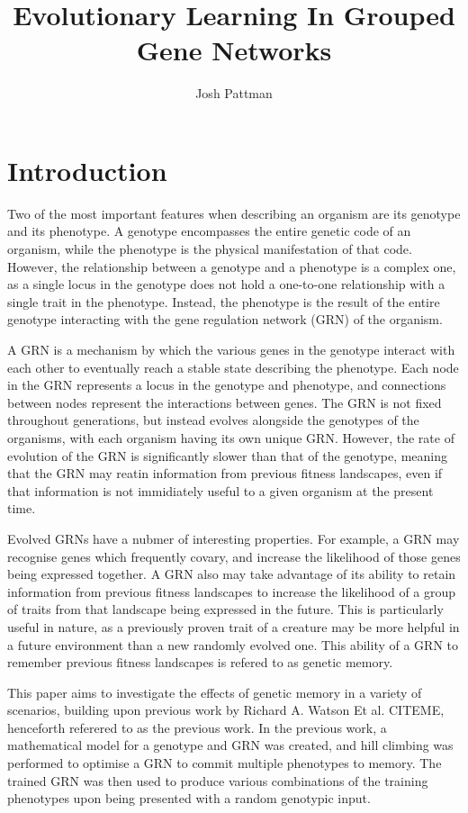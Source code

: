 \documentclass[twocolumn,a4paper]{article}
\author{Josh Pattman}
\title{Evolutionary Learning In Grouped Gene Networks}
\begin{document}
	\maketitle
    \section{Introduction}
    Two of the most important features when describing an organism are its genotype and its phenotype. A genotype encompasses the entire genetic code of an organism, while the phenotype is the physical manifestation of that code. However, the relationship between a genotype and a phenotype is a complex one, as a single locus in the genotype does not hold a one-to-one relationship with a single trait in the phenotype. Instead, the phenotype is the result of the entire genotype interacting with the gene regulation network (GRN) of the organism.

    A GRN is a mechanism by which the various genes in the genotype interact with each other to eventually reach a stable state describing the phenotype. Each node in the GRN represents a locus in the genotype and phenotype, and connections between nodes represent the interactions between genes. The GRN is not fixed throughout generations, but instead evolves alongside the genotypes of the organisms, with each organism having its own unique GRN. However, the rate of evolution of the GRN is significantly slower than that of the genotype, meaning that the GRN may reatin information from previous fitness landscapes, even if that information is not immidiately useful to a given organism at the present time.

    Evolved GRNs have a nubmer of interesting properties. For example, a GRN may recognise genes which frequently covary, and increase the likelihood of those genes being expressed together. A GRN also may take advantage of its ability to retain information from previous fitness landscapes to increase the likelihood of a group of traits from that landscape being expressed in the future. This is particularly useful in nature, as a previously proven trait of a creature may be more helpful in a future environment than a new randomly evolved one. This ability of a GRN to remember previous fitness landscapes is refered to as genetic memory.

    This paper aims to investigate the effects of genetic memory in a variety of scenarios, building upon previous work by Richard A. Watson Et al. CITEME, henceforth referered to as the previous work. In the previous work, a mathematical model for a genotype and GRN was created, and hill climbing was performed to optimise a GRN to commit multiple phenotypes to memory. The trained GRN was then used to produce various combinations of the training phenotypes upon being presented with a random genotypic input.
\end{document}
